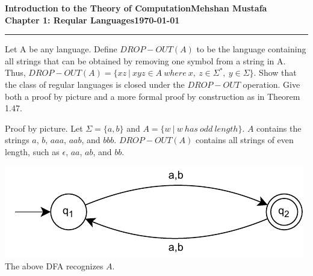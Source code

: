 \documentclass[11pt]{article}
\newcommand{\myname}{Mehshan Mustafa}
\newcommand{\dated}{\today}
\newenvironment{problem}[2][Problem]{\begin{trivlist}
\item[\hskip \labelsep {\bfseries #1}\hskip \labelsep {\bfseries #2.}]}{\end{trivlist}}
\begin{document}
\textbf{Introduction to the Theory of
Computation}\hfill\textbf{\myname}\\[0.01in]
\textbf{Chapter 1: Reqular Languages}\hfill\textbf{\dated}\\
\smallskip\hrule\bigskip

\begin{problem}{1.43}
Let A be any language. Define $DROP-OUT(A)$ to be the language containing all strings that can be obtained by removing one symbol from a string in A. Thus, $DROP-OUT (A) = \{xz \ | \ xyz \in A \ where \ x, \ z \in \Sigma^{*}, \ y \in \Sigma\}$. Show that the class of regular languages is closed under the $DROP-OUT$ operation. Give both a proof by picture and a more formal proof by construction as in Theorem 1.47.
\end{problem}

\begin{problem}[Part]{1}
Proof by picture. Let $\Sigma=\{a,b\}$ and $A=\{w \ | \ w \ has \ odd \ length\}$. $A$ contains the strings $a$, $b$, $aaa$, $aab$, and $bbb$. $DROP-OUT(A)$ contains all strings of even length, such as $\epsilon$, $aa$, $ab$, and $bb$.
\end{problem}

\begin{center}
\includegraphics[scale=1]{Figures/Problem1.43a.pdf} \\
 The above DFA recognizes $A$.
\end{center}
\end{document}
